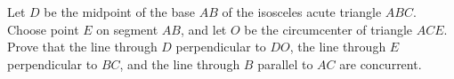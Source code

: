 Let $D$ be the midpoint of the base $AB$ of the isosceles acute triangle $ABC$. Choose point $E$ on segment $AB$, and let $O$ be the circumcenter of triangle $ACE$. Prove that the line through $D$ perpendicular to $DO$, the line through $E$ perpendicular to $BC$, and the line through $B$ parallel to $AC$ are concurrent.